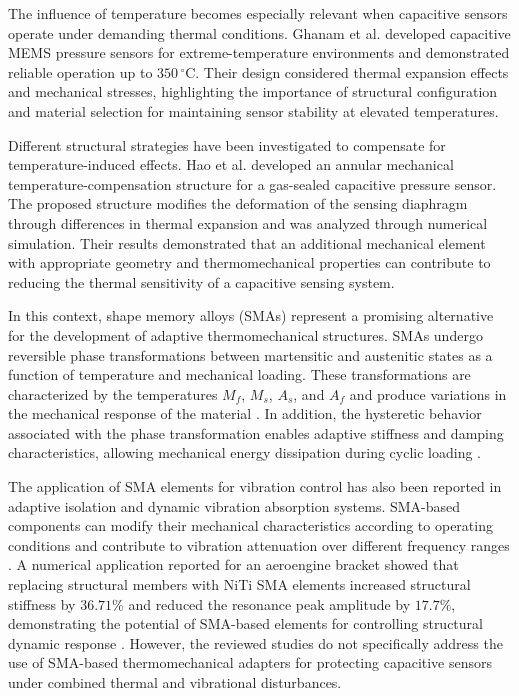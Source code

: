 \documentclass[conference]{IEEEtran}
\begin{document}
The influence of temperature becomes especially relevant when capacitive sensors operate under demanding thermal conditions. Ghanam et al. \cite{Ghanam2025} developed capacitive MEMS pressure sensors for extreme-temperature environments and demonstrated reliable operation up to $350\,^{\circ}\mathrm{C}$. Their design considered thermal expansion effects and mechanical stresses, highlighting the importance of structural configuration and material selection for maintaining sensor stability at elevated temperatures.

Different structural strategies have been investigated to compensate for temperature-induced effects. Hao et al. \cite{Hao2012} developed an annular mechanical temperature-compensation structure for a gas-sealed capacitive pressure sensor. The proposed structure modifies the deformation of the sensing diaphragm through differences in thermal expansion and was analyzed through numerical simulation. Their results demonstrated that an additional mechanical element with appropriate geometry and thermomechanical properties can contribute to reducing the thermal sensitivity of a capacitive sensing system.

In this context, shape memory alloys (SMAs) represent a promising alternative for the development of adaptive thermomechanical structures. SMAs undergo reversible phase transformations between martensitic and austenitic states as a function of temperature and mechanical loading. These transformations are characterized by the temperatures $M_f$, $M_s$, $A_s$, and $A_f$ and produce variations in the mechanical response of the material \cite{Hossain2025}. In addition, the hysteretic behavior associated with the phase transformation enables adaptive stiffness and damping characteristics, allowing mechanical energy dissipation during cyclic loading \cite{Hossain2025}.

The application of SMA elements for vibration control has also been reported in adaptive isolation and dynamic vibration absorption systems. SMA-based components can modify their mechanical characteristics according to operating conditions and contribute to vibration attenuation over different frequency ranges \cite{Hossain2025}. A numerical application reported for an aeroengine bracket showed that replacing structural members with NiTi SMA elements increased structural stiffness by $36.71\%$ and reduced the resonance peak amplitude by $17.7\%$, demonstrating the potential of SMA-based elements for controlling structural dynamic response \cite{Hossain2025}. However, the reviewed studies do not specifically address the use of SMA-based thermomechanical adapters for protecting capacitive sensors under combined thermal and vibrational disturbances.
\end{document}
